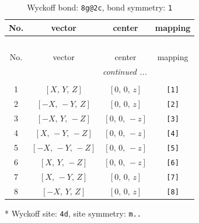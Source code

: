 \documentclass[fleqn,8pt]{jsarticle}
\begin{document}
\begin{longtable}{cccc}
\caption{Wyckoff bond: {\tt 8g@2c}, bond symmetry: {\tt 1}}
 \\
 \hline \hline
No. & vector & center & mapping \\ \hline \endfirsthead

\multicolumn{3}{l}{\tablename\ \thetable{}} \\
 \hline \hline
No. & vector & center & mapping \\ \hline \endhead

 \hline \hline
\multicolumn{3}{r}{\footnotesize\it continued ...} \\ \endfoot

 \hline \hline
\multicolumn{3}{r}{} \\ \endlastfoot

1 & $\left[ X,\, Y,\, Z \right]$ & $\left[ 0,\, 0,\, z \right]$ & {\tt [1]} \\ \hline
2 & $\left[ - X,\, - Y,\, Z \right]$ & $\left[ 0,\, 0,\, z \right]$ & {\tt [2]} \\ \hline
3 & $\left[ - X,\, Y,\, - Z \right]$ & $\left[ 0,\, 0,\, - z \right]$ & {\tt [3]} \\ \hline
4 & $\left[ X,\, - Y,\, - Z \right]$ & $\left[ 0,\, 0,\, - z \right]$ & {\tt [4]} \\ \hline
5 & $\left[ - X,\, - Y,\, - Z \right]$ & $\left[ 0,\, 0,\, - z \right]$ & {\tt [5]} \\ \hline
6 & $\left[ X,\, Y,\, - Z \right]$ & $\left[ 0,\, 0,\, - z \right]$ & {\tt [6]} \\ \hline
7 & $\left[ X,\, - Y,\, Z \right]$ & $\left[ 0,\, 0,\, z \right]$ & {\tt [7]} \\ \hline
8 & $\left[ - X,\, Y,\, Z \right]$ & $\left[ 0,\, 0,\, z \right]$ & {\tt [8]} \\
\end{longtable}
* Wyckoff site: {\tt 4d}, site symmetry: {\tt m..}
\renewcommand{\arraystretch}{1.2}
\end{document}
